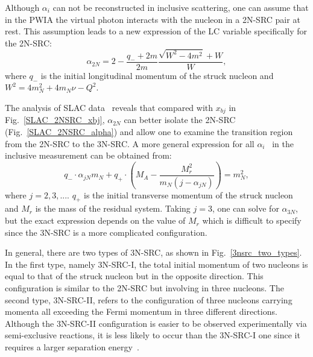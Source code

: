 Although $\alpha_{i}$ can not be reconstructed in inclusive scattering, one can assume that in the PWIA the virtual photon interacts with the nucleon in a 2N-SRC pair at rest. This assumption leads to a new expression of the LC variable specifically for the 2N-SRC:
\begin{equation}
  \alpha_{2N} = 2-\frac{q_{-}+2m}{2m}\frac{\sqrt{W^{2}-4m^{2}}+W}{W},  
\end{equation}
where $q_{-}$ is the initial longitudinal momentum of the struck nucleon and $W^{2}=4m_{N}^{2}+4m_{N}\nu-Q^{2}$. 

The analysis of SLAC data~\cite{SLAC_Measurement_PRC.48.2451} reveals that compared with $x_{bj}$ in Fig.~\ref{SLAC_2NSRC_xbj}, $\alpha_{2N}$ can better isolate the 2N-SRC (Fig.~\ref{SLAC_2NSRC_alpha}) and allow one to examine the transition region from the 2N-SRC to the 3N-SRC. A more general expression for all $\alpha_{i}$~\cite{e08014_pr} in the inclusive measurement can be obtained from:
\begin{equation}
  q_{-}\cdot\alpha_{jN}m_{N}+q_{+}\cdot\left(M_{A}-\frac{M_{r}^{2}}{m_{N}(j-\alpha_{jN})}\right)=m_{N}^{2},
\end{equation}
where $j=2,3,...$. $q_{+}$ is the initial transverse momentum of the struck nucleon and $M_{r}$ is the mass of the residual system. Taking $j=3$, one can solve for $\alpha_{3N}$, but the exact expression depends on the value of $M_{r}$ which is difficult to specify since the 3N-SRC is a more complicated configuration.

 In general, there are two types of 3N-SRC, as shown in Fig.~\ref{3nsrc_two_types}. In the first type, namely 3N-SRC-I, the total initial momentum of two nucleons is equal to that of the struck nucleon but in the opposite direction. This configuration is similar to the 2N-SRC but involving in three nucleons. The second type, 3N-SRC-II, refers to the configuration of three nucleons carrying momenta all exceeding the Fermi momentum in three different directions. Although the 3N-SRC-II configuration is easier to be observed experimentally via semi-exclusive reactions, it is less likely to occur than the 3N-SRC-I one since it requires a larger separation energy~\cite{Frankfurt_misak}.
 
